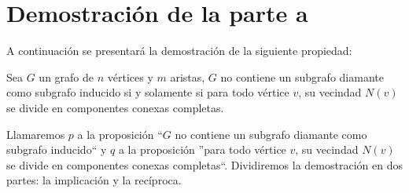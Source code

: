 \documentclass[a4paper,11pt] {article}
\begin{document}
\section*{Demostraci\'on de la parte a}

A continuaci\'on se presentar\'a la demostraci\'on de la siguiente propiedad:

Sea $G$ un grafo de $n$ v\'ertices y $m$ aristas, $G$ no contiene un subgrafo diamante como subgrafo inducido si y solamente si para todo v\'ertice $v$, su vecindad $N(v)$ se divide en componentes conexas completas.

Llamaremos $p$ a la proposici\'on ``$G$ no contiene un subgrafo diamante como subgrafo inducido`` y $q$ a la proposici\'on ''para todo v\'ertice $v$, su vecindad $N(v)$ se divide en componentes conexas completas``. Dividiremos la demostraci\'on en dos partes: la implicaci\'on y la rec\'iproca.
\end{document}
